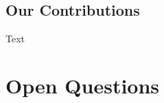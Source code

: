 \subsection{Our Contributions}
Text

\clearpage


\section{Open Questions}
\label{ch2:questions}

\clearpage



